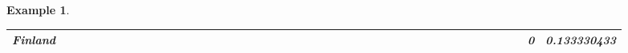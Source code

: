 \documentclass[a4paper,11pt]{report}
\newtheorem{example}[theorem]{Example}
\begin{document}
\begin{example}
\begin{appendices}
\begin{landscape}
\begin{longtable}{r|r|r|r|r|r|r|r|r|r|r|r|r|r|r|r|r|r|r|r|r|r|r|r|r|r|r|r|r|r|r|r|r|r|r|r|r|r|r|r|r|r|r|r|}
\multicolumn{1}{|r|}{\textbf{Finland}}               &                                       &                                       &                                          &                                       &                                       &                                                     &                                        &                                       &                                      &                                       &                                       &                                                &                                       &                                      &                                       &                                       &                                      &                                       &                                       &                                      &                                      &                                         &                                     &                                       &                                      &                                      &                                        &                                       &                                      &                                      &                                        &                                        &                                     &                                      &                                           &                                               &                                      &                                       &                                              &                                      &                                     & 0                                             & 0.133330433                             \\ \hline

\end{longtable}
\end{landscape}
\end{appendices}
\end{example}
\end{document}
